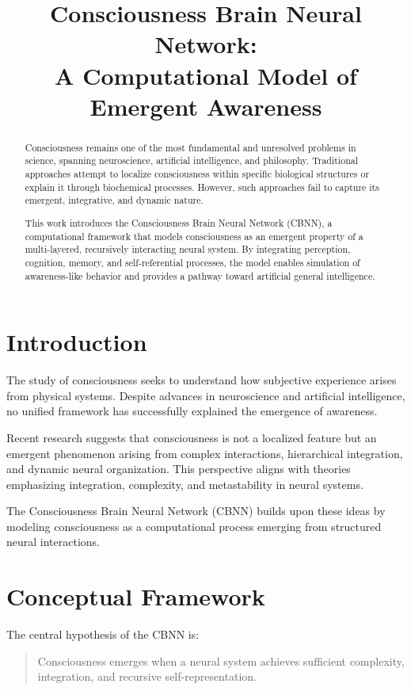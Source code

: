 \documentclass[12pt]{article}
\title{\textbf{Consciousness Brain Neural Network: \\ A Computational Model of Emergent Awareness}}
\author{}
\date{}
\begin{document}
\maketitle

\begin{abstract}
Consciousness remains one of the most fundamental and unresolved problems in science, spanning neuroscience, artificial intelligence, and philosophy. Traditional approaches attempt to localize consciousness within specific biological structures or explain it through biochemical processes. However, such approaches fail to capture its emergent, integrative, and dynamic nature.

This work introduces the Consciousness Brain Neural Network (CBNN), a computational framework that models consciousness as an emergent property of a multi-layered, recursively interacting neural system. By integrating perception, cognition, memory, and self-referential processes, the model enables simulation of awareness-like behavior and provides a pathway toward artificial general intelligence.
\end{abstract}

\section{Introduction}

The study of consciousness seeks to understand how subjective experience arises from physical systems. Despite advances in neuroscience and artificial intelligence, no unified framework has successfully explained the emergence of awareness.

Recent research suggests that consciousness is not a localized feature but an emergent phenomenon arising from complex interactions, hierarchical integration, and dynamic neural organization. This perspective aligns with theories emphasizing integration, complexity, and metastability in neural systems.

The Consciousness Brain Neural Network (CBNN) builds upon these ideas by modeling consciousness as a computational process emerging from structured neural interactions.

\section{Conceptual Framework}

The central hypothesis of the CBNN is:

\begin{quote}
Consciousness emerges when a neural system achieves sufficient complexity, integration, and recursive self-representation.
\end{quote}
\end{document}
